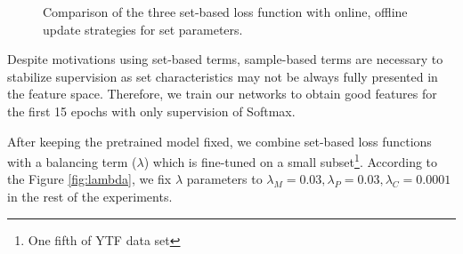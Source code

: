 \documentclass[10pt,twocolumn,letterpaper]{article}
\begin{document}
\begin{figure*}[t]
\begin{center}

  
  \hspace{0.02in}    
  
\end{center}
\caption{Comparison of the three set-based loss function with online, offline update strategies for set parameters.}

\label{fig:update}
\end{figure*}
Despite motivations using set-based terms, sample-based terms are necessary to stabilize supervision as set characteristics may not be always fully presented in the feature space. Therefore, we train our networks to obtain good features for the first 15 epochs with only supervision of Softmax.

After keeping the pretrained model fixed, we combine set-based loss functions with a balancing term ($\lambda$) which is fine-tuned on a small subset\footnote{One fifth of YTF data set}. According to the Figure \ref{fig:lambda}, we fix $\lambda$ parameters to  $\lambda_M = 0.03, \lambda_P = 0.03, \lambda_C = 0.0001$ in the rest of the experiments.
\end{document}
